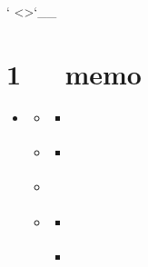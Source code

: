 \documentclass[letterpaper,12pt,english]{sphinxmanual}
\begin{document}
{}` \textless{}\textgreater{}{}`\_\_


\chapter{1   memo}
\label{\detokenize{000misc/memo:memo}}\label{\detokenize{000misc/memo::doc}}
\begin{sphinxShadowBox}
\begin{itemize}
\item {} 
\label{\detokenize{000misc/memo:id16}}{\hyperref[\detokenize{000misc/memo:memo}]{}}
\begin{itemize}
\item {} 
\label{\detokenize{000misc/memo:id17}}{\hyperref[\detokenize{000misc/memo:recent}]{}}
\begin{itemize}
\item {} 
\label{\detokenize{000misc/memo:id18}}{\hyperref[\detokenize{000misc/memo:xxx}]{}}

\end{itemize}

\item {} 
\label{\detokenize{000misc/memo:id19}}{\hyperref[\detokenize{000misc/memo:life}]{}}
\begin{itemize}
\item {} 
\label{\detokenize{000misc/memo:id20}}{\hyperref[\detokenize{000misc/memo:id2}]{}}

\end{itemize}

\item {} 
\label{\detokenize{000misc/memo:id21}}{\hyperref[\detokenize{000misc/memo:study}]{}}

\item {} 
\label{\detokenize{000misc/memo:id22}}{\hyperref[\detokenize{000misc/memo:id3}]{}}
\begin{itemize}
\item {} 
\label{\detokenize{000misc/memo:id23}}{\hyperref[\detokenize{000misc/memo:id4}]{}}

\item {} 
\label{\detokenize{000misc/memo:id24}}{\hyperref[\detokenize{000misc/memo:web}]{}}


\end{itemize}
\end{itemize}
\end{itemize}
\end{sphinxShadowBox}
\end{document}
